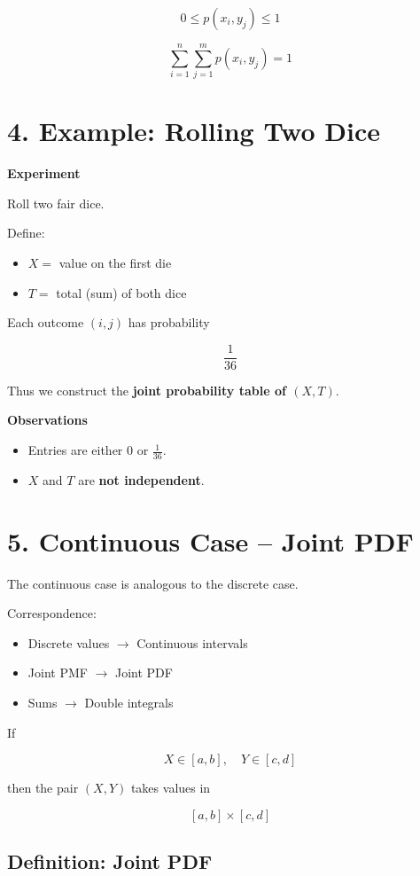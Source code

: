 \documentclass[12pt]{article}
\begin{document}
\[
0 \le p(x_i, y_j) \le 1
\]

\[
\sum_{i=1}^{n}\sum_{j=1}^{m} p(x_i, y_j) = 1
\]

\section*{4. Example: Rolling Two Dice}

\textbf{Experiment}

Roll two fair dice.

Define:

\begin{itemize}
\item $X =$ value on the first die
\item $T =$ total (sum) of both dice
\end{itemize}

Each outcome $(i,j)$ has probability

\[
\frac{1}{36}
\]

Thus we construct the \textbf{joint probability table of $(X,T)$}.

\textbf{Observations}

\begin{itemize}
\item Entries are either $0$ or $\frac{1}{36}$.
\item $X$ and $T$ are \textbf{not independent}.
\end{itemize}

\section*{5. Continuous Case -- Joint PDF}

The continuous case is analogous to the discrete case.

Correspondence:

\begin{itemize}
\item Discrete values $\rightarrow$ Continuous intervals
\item Joint PMF $\rightarrow$ Joint PDF
\item Sums $\rightarrow$ Double integrals
\end{itemize}

If

\[
X \in [a,b], \quad Y \in [c,d]
\]

then the pair $(X,Y)$ takes values in

\[
[a,b] \times [c,d]
\]

\subsection*{Definition: Joint PDF}
\end{document}
